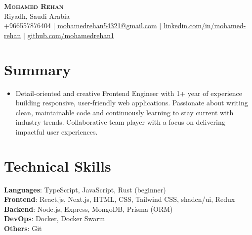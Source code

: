 \documentclass[letterpaper,11pt]{article}
\newcommand{\resumeSubHeadingListStart}{\begin{itemize}[leftmargin=0.15in, label={}]}
\newcommand{\resumeSubHeadingListEnd}{\end{itemize}}
\begin{document}

\begin{center}
    \textbf{\Huge \scshape Mohamed Rehan} \\ \vspace{4pt}
    \normalsize Riyadh, Saudi Arabia \\ \vspace{6pt}
    \small +966557876404 $|$ 
    \href{mailto:mohamedrehan54321@gmail.com}{\underline{mohamedrehan54321@gmail.com}} $|$ 
    \href{https://www.linkedin.com/in/mohamed-rehan/}{\underline{linkedin.com/in/mohamed-rehan}} $|$
    \href{https://www.github.com/mohamedrehan1}{\underline{github.com/mohamedrehan1}}
\end{center}



\section{Summary}
\resumeSubHeadingListStart
  \item
    \small{Detail-oriented and creative Frontend Engineer with 1+ year of experience building responsive, user-friendly web applications. Passionate about writing clean, maintainable code and continuously learning to stay current with industry trends. Collaborative team player with a focus on delivering impactful user experiences.}
\resumeSubHeadingListEnd



\section{Technical Skills}
 \begin{itemize}[leftmargin=0.15in, label={}]
    \small{\item{
     \textbf{Languages}{:  TypeScript, JavaScript, Rust (beginner)} \\
     \textbf{Frontend}{: React.js, Next.js, HTML, CSS, Tailwind CSS, shadcn/ui, Redux} \\
    \textbf{Backend}{: Node.js, Express, MongoDB, Prisma (ORM)} \\
     \textbf{DevOps}{: Docker, Docker Swarm} \\
     \textbf{Others}{: Git}
    }}
 \end{itemize}
\end{document}
